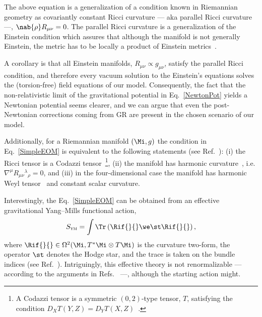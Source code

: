 \documentclass[aps,prl,twocolumn,superscriptaddress,showpacs,showkeys]{revtex4-1}
\begin{document}
The above equation is a generalization of a condition known in Riemannian geometry as covariantly constant Ricci curvature --- aka parallel Ricci curvature ---, \mbox{$\nab{\rho} R_{\mu\nu} = 0$.} The parallel Ricci curvature is a generalization of the Einstein condition which assures that although the manifold is not generally Einstein, the metric has to be locally a product of Einstein metrics~\cite{Besse}.

A corollary is that all Einstein manifolds, \mbox{$R_{\mu\nu} \propto g_{\mu\nu}$,} satisfy the parallel Ricci condition, and therefore every vacuum solution to the Einstein's equations solves the (torsion-free) field equations of our model. Consequently, the fact that the non-relativistic limit of the gravitational potential in Eq.~\eqref{NewtonPot} yields a Newtonian potential seems clearer, and we can argue that even the post-Newtonian corrections coming from GR are present in the chosen scenario of our model.

Additionally, for a Riemannian manifold $(\Mi,g)$ the condition in Eq.~\eqref{SimpleEOM} is equivalent to the following statements (see Ref.~\cite{Derdzinski:1985,Besse}): (i) the Ricci tensor is a Codazzi tensor~\footnote{A Codazzi tensor is a symmetric $(0,2)$-type tensor, $T$, satisfying the condition \mbox{$D_X T(Y,Z) = D_Y T(X,Z)$~\cite{Derdzinski01071983}.}}, (ii) the manifold has harmonic curvature~\cite{bourguignon1981varietes}, i.e. \mbox{$\nabla^\mu R_{\mu\nu}{}^\lambda{}_\rho = 0$,} and (iii) in the four-dimensional case the manifold has harmonic Weyl tensor~\cite{Berger:1969} and constant scalar curvature.

Interestingly, the Eq.~\eqref{SimpleEOM} can be obtained from an effective gravitational Yang--Mills functional action,
\begin{equation}
  S_{\textsc{ym}} = \int \Tr \left( \Rif{}{} \we \st \Rif{}{} \right),
\end{equation}
where $\Rif{}{} \in \Omega^2(\Mi, T^*\Mi \otimes T\Mi)$ is the curvature two-form, the operator $\st$ denotes the Hodge star, and the trace is taken on the bundle indices (see Ref.~\cite{bourguignon1982yang}). Intriguingly, this effective theory is not renormalizable --- according to the arguments in Refs.~\cite{McGady:2013sga,Camanho:2014apa} ---, although the starting action might.
\end{document}
